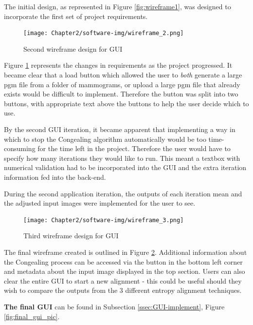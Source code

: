 The initial design, as represented in Figure \ref{fig:wireframe1}, was designed to incorporate the first set of project requirements.

\begin{figure}[H]
  \center
  \texttt{[image: Chapter2/software-img/wireframe\_2.png]}
  \caption{Second wireframe design for \acrshort{GUI}}
  \label{fig:wireframe2}
\end{figure}

Figure \ref{fig:wireframe2} represents the changes in requirements as the project progressed. It became clear that a load button which allowed the user to \textit{both} generate a large pgm file from a folder of mammograms, or upload a large pgm file that already exists would be difficult to implement. Therefore the button was split into two buttons, with appropriate text above the buttons to help the user decide which to use.

By the second \acrshort{GUI} iteration, it became apparent that implementing a way in which to stop the \Gls{Congealing} algorithm automatically would be too time-consuming for the time left in the project. Therefore the user would have to specify how many iterations they would like to run. This meant a textbox with numerical validation had to be incorporated into the \acrshort{GUI} and the extra iteration information fed into the back-end.

During the second application iteration, the outputs of each iteration mean and the adjusted input images were implemented for the user to see.

\begin{figure}[H]
  \center
  \texttt{[image: Chapter2/software-img/wireframe\_3.png]}
  \caption{Third wireframe design for \acrshort{GUI}}
  \label{fig:wireframe3}
\end{figure}
The final wireframe created is outlined in Figure \ref{fig:wireframe3}. Additional information  about the \Gls{Congealing} process can be accessed via the button in the bottom left corner and metadata about the input image displayed in the top section. Users can also clear the entire \acrshort{GUI} to start a new alignment - this could be useful should they wish to compare the outputs from the 3 different entropy alignment techniques.

\noindent \textbf{The final \acrshort{GUI}} can be found in Subsection \ref{ssec:GUI-implement}, Figure \ref{fig:final_gui_pic}.
